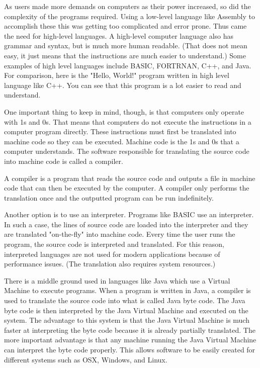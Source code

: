 

As users made more demands on computers as their power increased, so did the complexity of the programs required. Using a low-level language like Assembly to accomplish these this was getting too complicated and error prone. Thus came the need for high-level languages. A high-level computer language also has grammar and syntax, but is much more human readable. (That does not mean easy, it just means that the instructions are much easier to understand.) Some examples of high level languages include BASIC, FORTRNAN, C++, and Java.
For comparison, here is the "Hello, World!" program written in high level language like C++. You can see that this program is a lot easier to read and understand.



One important thing to keep in mind, though, is that computers only operate with 1s and 0s. That means that computers do not execute the instructions in a computer program directly. These instructions must first be translated into machine code so they can be executed. Machine code is the 1s and 0s that a computer understands. The software responsible for translating the source code into machine code is called a compiler.

A compiler is a program that reads the source code and outputs a file in machine code that can then be executed by the computer. A compiler only performs the translation once and the outputted program can be run indefinitely.

Another option is to use an interpreter. Programs like BASIC use an interpreter. In such a case, the lines of source code are loaded into the interpreter and they are translated "on-the-fly" into machine code. Every time the user runs the program, the source code is interpreted and translated. For this reason, interpreted languages are not used for modern applications because of performance issues. (The translation also requires system resources.)

There is a middle ground used in languages like Java which use a Virtual Machine to execute programs. When a program is written in Java, a compiler is used to translate the source code into what is called Java byte code. The Java byte code is then interpreted by the Java Virtual Machine and executed on the system. The advantage to this system is that the Java Virtual Machine is much faster at interpreting the byte code because it is already partially translated. The more important advantage is that any machine running the Java Virtual Machine can interpret the byte code properly. This allows software to be easily created for different systems such as OSX, Windows, and Linux.

